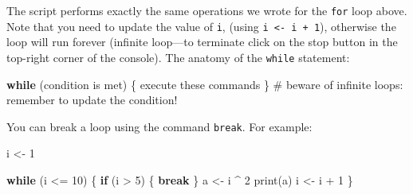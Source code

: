 \documentclass[
  letterpaper,
  DIV=11,
  numbers=noendperiod]{scrreprt}
\newenvironment{Shaded}{\begin{snugshade}}{\end{snugshade}}
\newcommand{\CommentTok}[1]{\textcolor[rgb]{0.37,0.37,0.37}{#1}}
\newcommand{\ControlFlowTok}[1]{\textcolor[rgb]{0.00,0.23,0.31}{\textbf{#1}}}
\newcommand{\DecValTok}[1]{\textcolor[rgb]{0.68,0.00,0.00}{#1}}
\newcommand{\FunctionTok}[1]{\textcolor[rgb]{0.28,0.35,0.67}{#1}}
\newcommand{\NormalTok}[1]{\textcolor[rgb]{0.00,0.23,0.31}{#1}}
\newcommand{\OtherTok}[1]{\textcolor[rgb]{0.00,0.23,0.31}{#1}}
\newcommand{\SpecialCharTok}[1]{\textcolor[rgb]{0.37,0.37,0.37}{#1}}
\begin{document}
The script performs exactly the same operations we wrote for the
\texttt{for} loop above. Note that you need to update the value of
\texttt{i}, (using \texttt{i\ \textless{}-\ i\ +\ 1}), otherwise the
loop will run forever (infinite loop---to terminate click on the stop
button in the top-right corner of the console). The anatomy of the
\texttt{while} statement:

\begin{Shaded}
\begin{Highlighting}[]
\ControlFlowTok{while}\NormalTok{ (condition is met) \{}
\NormalTok{  execute these commands}
\NormalTok{\} }\CommentTok{\# beware of infinite loops: remember to update the condition!}
\end{Highlighting}
\end{Shaded}

You can break a loop using the command \texttt{break}. For example:

\begin{Shaded}
\begin{Highlighting}[]
\NormalTok{i }\OtherTok{\textless{}{-}} \DecValTok{1}

\ControlFlowTok{while}\NormalTok{ (i }\SpecialCharTok{\textless{}=} \DecValTok{10}\NormalTok{) \{}
  \ControlFlowTok{if}\NormalTok{ (i }\SpecialCharTok{\textgreater{}} \DecValTok{5}\NormalTok{) \{}
    \ControlFlowTok{break}
\NormalTok{  \}}
\NormalTok{  a }\OtherTok{\textless{}{-}}\NormalTok{ i }\SpecialCharTok{\^{}} \DecValTok{2}
  \FunctionTok{print}\NormalTok{(a)}
\NormalTok{  i }\OtherTok{\textless{}{-}}\NormalTok{ i }\SpecialCharTok{+} \DecValTok{1}
\NormalTok{\}}
\end{Highlighting}
\end{Shaded}
\end{document}
